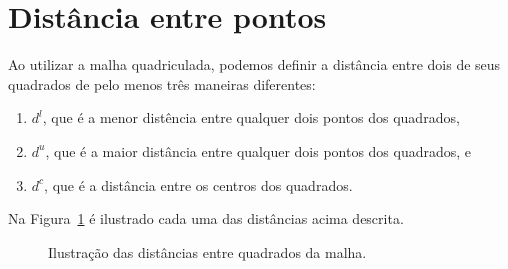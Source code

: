 %
%
%

\section{Distância entre pontos} \label{sse:distance}
Ao utilizar a malha quadriculada, podemos definir a distância entre dois
de seus quadrados de pelo menos três maneiras diferentes:
\begin{enumerate}
    \item $d^l$, que é a menor distência entre qualquer dois pontos dos
        quadrados,
    \item $d^u$, que é a maior distância entre qualquer dois pontos dos
        quadrados, e
    \item $d^c$, que é a distância entre os centros dos quadrados.
\end{enumerate}
Na Figura~\ref{fig:dist_malha} é ilustrado cada uma das distâncias acima
descrita.
\begin{figure}[!htb]
    \centering
    \caption{Ilustra\c{c}\~{a}o das dist\^{a}ncias entre quadrados da malha.}
    \label{fig:dist_malha}
\end{figure}
